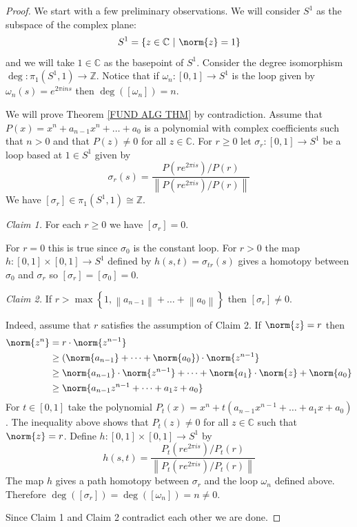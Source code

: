 \documentclass[11pt, letterpaper, oneside]{report}
\theoremstyle{pplain}
\theoremstyle{ddefinition}
\theoremstyle{nnn}
\theoremstyle{eexercise}
\newcommand{\Z}{{\mathbb Z}}
\newcommand{\C}{{\mathbb C}}
\begin{document}
\begin{proof}
We start with a few preliminary observations. We will consider $S^{1}$ as the subspace 
of the complex plane:
$$S^{1} = \{ z \in \C \ | \ \norm{z} = 1 \}$$
and we will take $1\in \C$ as the basepoint of $S^{1}$. Consider the degree 
isomorphism $\deg\colon \pi_{1}(S^{1}, 1) \to \Z$.
Notice that if $\omega_{n} \colon [0, 1] \to S^{1}$ is the loop given by 
$\omega_{n}(s)  = e^{2\pi ins}$ then $\deg([\omega_{n}]) = n$. 

We will prove Theorem \ref{FUND ALG THM} by contradiction. 
Assume  that $P(x) = x^{n} + a_{n-1}x^{n} + \dots + a_{0}$ is a polynomial with complex
coefficients such that $n>0$ and that $P(z) \neq 0$ for all $z\in \C$.  
For $r \geq 0$ let $\sigma_{r}\colon [0, 1]\to S^{1}$ be a loop based at $1\in S^{1}$ given by
$$\sigma_{r}(s) = \frac{P(re^{2\pi is})/P(r)}{\left\| P(re^{2\pi is})/P(r) \right\|}$$ 
We have $[\sigma_{r}]\in \pi_{1}(S^{1}, 1) \cong \Z$. 

\emph{Claim 1.} For each $r\geq 0$ we have $[\sigma_{r}] = 0$. 

For $r=0$ this is true since $\sigma_{0}$ is the constant loop. For $r>0$ the map 
$h\colon [0, 1]\times [0, 1]\to S^{1}$ defined by $h(s, t) = \sigma_{tr}(s)$ gives a homotopy 
between $\sigma_{0}$ and $\sigma_{r}$ so $[\sigma_{r}] = [\sigma_{0}] = 0$. 

\emph{Claim 2.} If $r >  \max\left\{1, \left\| a_{n-1}\right\| + \dots +  \left\| a_{0}\right\|\right\}$ then 
$[\sigma_{r}] \neq 0$. 

Indeed, assume that $r$ satisfies the assumption of Claim 2. If $\norm{z} = r$ then 
\begin{align*}
\norm{z^{n}}  
& = r\cdot \norm{ z^{n-1}}\\
& \geq  \left(\norm{a_{n-1}} + \dots +  \norm{a_{0}}\right) \cdot \norm{z^{n-1}} 
\\ 
& \geq  \norm{a_{n-1}}\cdot \norm{z^{n-1}} + \dots +  \norm{a_{1}}\cdot \norm{z} + \norm{a_{0}} \\ 
& \geq  \norm{a_{n-1}z^{n-1} + \dots + a_{1}z + a_{0}}
\end{align*}
For $t\in [0, 1]$ take the polynomial $P_{t}(x) = x^{n} + t(a_{n-1}x^{n-1} + \dots + a_{1}x + a_{0})$.
The inequality above shows that $P_{t}(z) \neq 0$ for all $z\in \C$ such that $\norm{z} = r$. 
Define $h\colon [0, 1]\times [0, 1] \to S^{1}$ by 
$$h(s, t) = \frac{P_{t}(re^{2\pi is})/P_{t}(r)}{\left\| P_{t}(re^{2\pi is})/P_{t}(r) \right\|}$$
The map $h$ gives a path homotopy between $\sigma_{r}$ and the loop 
$\omega_{n}$ defined above. Therefore $\deg([\sigma_{r}]) = \deg([\omega_{n}]) = n \neq 0$. 

Since Claim 1 and Claim 2 contradict each other we are done. 
\end{proof}
\end{document}
